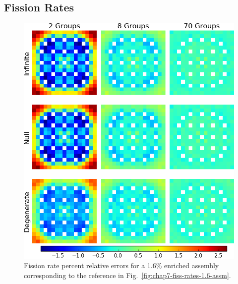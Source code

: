 \begin{appendices}
\section{Fission Rates}
\label{sec:quantify-fiss-rates}

\begin{figure}[h!]
\centering
\includegraphics[width=\linewidth]{figures/quantification/appendix/assm-16/fiss-err}
\vspace{2mm}
\caption[Fission rate errors for a 1.6\% enriched assembly]{Fission rate percent relative errors for a 1.6\% enriched assembly corresponding to the reference in Fig.~\ref{fig:chap7-fiss-rates-1.6-assm}.}
\label{fig:quantify-assm-1.6-fiss-err}
\end{figure}

\clearpage


\end{appendices}
